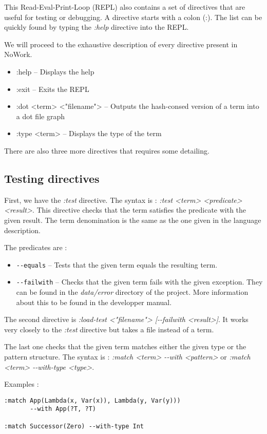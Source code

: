 \documentclass[12pt,a4paper]{article}
\begin{document}
This Read-Eval-Print-Loop (REPL) also contains a set of directives
that are useful for testing or debugging. A directive starts with a
colon (:). The list can be quickly found by typing the \emph{:help}
directive into the REPL.

We will proceed to the exhaustive description of every directive
present in NoWork.

\begin{itemize}
  \item :help -- Displays the help
  \item :exit -- Exits the REPL
  \item :dot <term> <"filename"> -- Outputs the hash-consed version of
    a term into a dot file graph
  \item :type <term> -- Displays the type of the term
\end{itemize}

There are also three more directives that requires some detailing.

\subsection{Testing directives}

First, we have the \emph{:test} directive. The syntax is : \emph{:test
  <term> <predicate> <result>}. This directive checks that the term
satisfies the predicate with the given result. The term denomination
is the same as the one given in the language description.

The predicates are : 
\begin{itemize}
\item \texttt{-{}-equals} -- Tests that the given term equals the resulting term.
\item \texttt{-{}-failwith} -- Checks that the given term fails with the
  given exception. They can be found in the \emph{data/error}
  directory of the project. More information about this to be found in
  the developper manual.
\end{itemize}

The second directive is \emph{:load-test <"filename"> [-{}-failwith
  <result>]}. It works very closely to the \emph{:test} directive but
takes a file instead of a term.

The last one checks that the given term matches either the given type
or the pattern structure. The syntax is : \emph{:match <term> -{}-with
  <pattern>} or \emph{:match <term> -{}-with-type <type>}.

Examples : 
\begin{verbatim}
:match App(Lambda(x, Var(x)), Lambda(y, Var(y))) 
       --with App(?T, ?T) 

:match Successor(Zero) --with-type Int
\end{verbatim}
\end{document}
